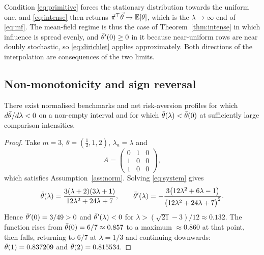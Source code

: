 \begin{remark}
\label{rem:consistency}
Condition \eqref{eq:primitive} forces the stationary distribution towards the
uniform one, and \eqref{eq:intense} then returns
$\vec\pi^{\top}\vec\theta\to\mathbb{E}[\theta]$, which is the $\lambda\to\infty$ end of
\eqref{eq:mf}. The mean-field regime is thus the case of
Theorem~\ref{thm:intense} in which influence is spread evenly, and
$\bar\theta'(0)\geq0$ in it because near-uniform rows are near doubly stochastic, so
\eqref{eq:dirichlet} applies approximately. Both directions of the interpolation
are consequences of the two limits.
\end{remark}

\subsection{Non-monotonicity and sign reversal}
\label{sec:reversal}

\begin{proposition}
\label{prop:reversal}
There exist normalised benchmarks and net risk-aversion profiles for which
$d\bar\theta/d\lambda<0$ on a non-empty interval and for which
$\bar\theta(\lambda)<\bar\theta(0)$ at sufficiently large comparison intensities.
\end{proposition}

\begin{proof}
Take $m=3$, $\theta=(\tfrac12,1,2)$, $\lambda_a=\lambda$ and
%
\begin{equation*}
A=\begin{pmatrix}0&1&0\\1&0&0\\1&0&0\end{pmatrix},
\end{equation*}
%
which satisfies Assumption~\ref{ass:norm}. Solving \eqref{eq:system} gives
%
\begin{equation}
\bar\theta(\lambda)=\frac{3(\lambda+2)(3\lambda+1)}{12\lambda^{2}+24\lambda+7},
\qquad
\bar\theta'(\lambda)=-\frac{3\big(12\lambda^{2}+6\lambda-1\big)}
{\big(12\lambda^{2}+24\lambda+7\big)^{2}} .
\label{eq:cex}
\end{equation}
%
Hence $\bar\theta'(0)=3/49>0$ and $\bar\theta'(\lambda)<0$ for
$\lambda>(\sqrt{21}-3)/12\approx0.132$. The function rises from
$\bar\theta(0)=6/7\approx0.857$ to a maximum $\approx0.860$ at that point, then
falls, returning to $6/7$ at $\lambda=1/3$ and continuing downwards:
$\bar\theta(1)=0.837209$ and $\bar\theta(2)=0.815534$.
\end{proof}

